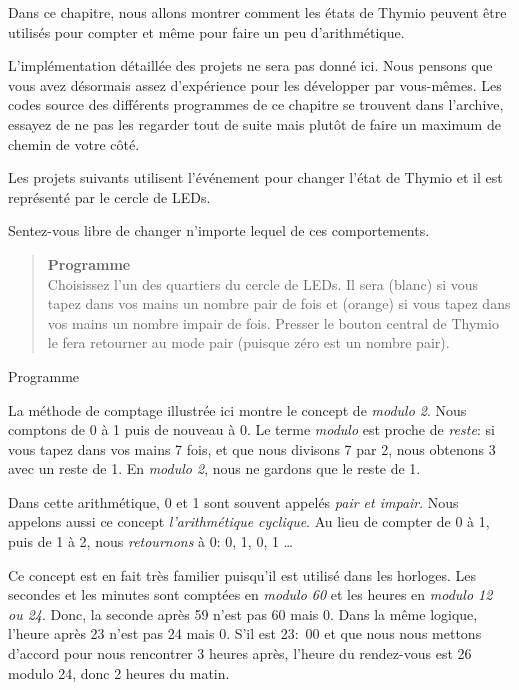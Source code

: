 
\label{ch.counting}

Dans ce chapitre, nous allons montrer comment les états de Thymio peuvent être utilisés pour compter et même pour faire un peu d'arithmétique. 

L'implémentation détaillée des projets ne sera pas donné ici. Nous pensons que vous avez désormais assez d'expérience pour les développer par vous-mêmes. Les codes source des différents programmes de ce chapitre se trouvent dans l'archive, essayez de ne pas les regarder tout de suite mais plutôt de faire un maximum de chemin de votre côté.

Les projets suivants utilisent l'événement  pour changer l'état de Thymio et il est représenté par le cercle de LEDs.


Sentez-vous libre de changer n'importe lequel de ces comportements.


\begin{quote}
\textbf{Programme}\\Choisissez l'un des quartiers du cercle de LEDs. Il sera  (blanc) si vous tapez dans vos mains un nombre pair de fois et  (orange) si vous tapez dans vos mains un nombre impair de fois. Presser le bouton central de Thymio le fera retourner au mode pair (puisque zéro est un nombre pair).
\end{quote}

{\raggedleft \hfill Programme }

La méthode de comptage illustrée ici montre le concept de \emph{modulo 2}. Nous comptons de 0 à 1 puis de nouveau à 0. Le terme \emph{modulo} est proche de \emph{reste}: si vous tapez dans vos mains 7 fois, et que nous divisons 7 par 2, nous obtenons 3 avec un reste de 1. En \emph{modulo 2}, nous ne gardons que le reste de 1.

Dans cette arithmétique, 0 et 1 sont souvent appelés \emph{pair et impair}. Nous appelons aussi ce concept \emph{l'arithmétique cyclique}. Au lieu de compter de 0 à 1, puis de 1 à 2, nous \emph{retournons} à 0: 0, 1, 0, 1 \ldots

Ce concept est en fait très familier puisqu'il est utilisé dans les horloges. Les secondes et les minutes sont comptées en \emph{modulo 60} et les heures en \emph{modulo 12 ou 24}. Donc, la seconde après 59 n'est pas 60 mais 0. Dans la même logique, l'heure après 23 n'est pas 24 mais 0. S'il est 23:\ 00 et que nous nous mettons d'accord pour nous rencontrer 3 heures après, l'heure du rendez-vous est 26 modulo 24, donc 2 heures du matin.

